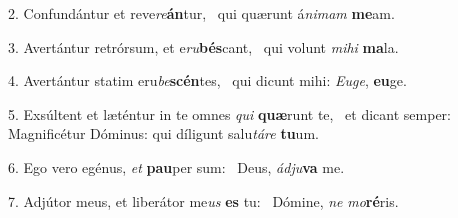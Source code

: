 2. Confundántur et reve\textit{re}\textbf{án}tur, \ast\  qui quærunt á\textit{ni}\textit{mam} \textbf{me}am.\

3. Avertántur retrórsum, et e\textit{ru}\textbf{bés}cant, \ast\  qui volunt \textit{mi}\textit{hi} \textbf{ma}la.\

4. Avertántur statim eru\textit{be}\textbf{scén}tes, \ast\  qui dicunt mihi: \textit{Eu}\textit{ge}, \textbf{eu}ge.\

5. Exsúltent et læténtur in te omnes \textit{qui} \textbf{quæ}runt te, \ast\  et dicant semper: Magnificétur Dóminus: qui díligunt salu\textit{tá}\textit{re} \textbf{tu}um.\

6. Ego vero egénus, \textit{et} \textbf{pau}per sum: \ast\  Deus, \textit{ád}\textit{ju}\textbf{va} me.\

7. Adjútor meus, et liberátor me\textit{us} \textbf{es} tu: \ast\  Dómine, \textit{ne} \textit{mo}\textbf{ré}ris.\

